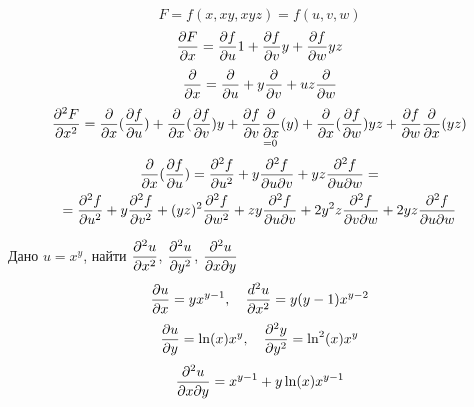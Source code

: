 \documentclass[main]{subfiles}
\begin{document}
  \begin{Example}
      \[F=f(x,x y, x y z)=f(u,v,w)\]
      \[\frac{\partial F}{\partial x}=\frac{\partial f}{\partial u} 1+ \frac{\partial f}{\partial v} y + \frac{\partial f}{\partial w} yz\]
      \[\frac{\partial}{\partial x}=\frac{\partial}{\partial u}+y \frac{\partial}{\partial v}+uz \frac{\partial}{\partial w}\]
      \[\frac{\partial^2 F}{\partial x^2} = \frac{\partial}{\partial x}(\frac{\partial f}{\partial u})+ \frac{\partial}{\partial x}(\frac{\partial f}{\partial v}) y + \underset{=0}{\frac{\partial f}{\partial v} \frac{\partial}{\partial x} (y)}+ \frac{\partial}{\partial x} (\frac{\partial f}{\partial w}) yz + \frac{\partial f}{\partial w} \frac{\partial}{\partial x} (yz)\]
      \begin{multline*}
          \frac{\partial}{\partial x} (\frac{\partial f}{\partial u})=\frac{\partial^2 f}{\partial u^2}+ y \frac{\partial^2 f}{\partial u \partial v}+yz \frac{\partial^2 f}{\partial u \partial w} =\\ = \frac{\partial^2 f}{\partial u^2}+y \frac{\partial^2 f}{\partial v^2}+(yz)^2 \frac{\partial^2 f}{\partial w^2}+z y \frac{\partial^2 f}{\partial u \partial v} + 2y^2 z \frac{\partial^2 f}{\partial v \partial w} + 2yz \frac{\partial^2 f}{\partial u \partial w}
      \end{multline*}
  \end{Example}

  \begin{example}
      Дано $u=x^y$, найти $\dfrac{\partial^2 u}{\partial x^2}$, $\dfrac{\partial^2 u}{\partial y^2}$, $\dfrac{\partial^2 u}{\partial x \partial y}$
      \\
      \[\dfrac{\partial u}{\partial x}=y x^{y-1}, \quad \dfrac{d^2 u}{\partial x^2}=y(y-1)x^{y-2}\]
      \[\dfrac{\partial u}{\partial y}=\ln(x) x^y, \quad \dfrac{\partial^2 y}{\partial y^2}=\ln^2(x) x^y\]
      \[\dfrac{\partial^2 u}{\partial x \partial y}=x^{y-1}+y \ln(x) x^{y-1}\]
  \end{example}
\end{document}
